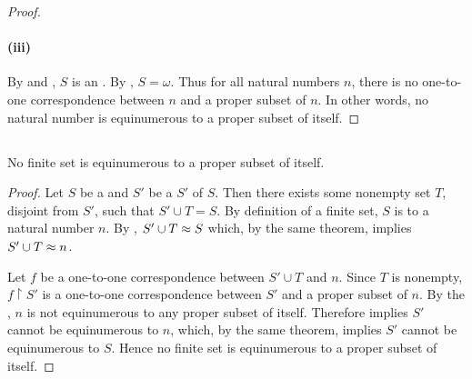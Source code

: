 \documentclass{report}
\begin{document}
\begin{proof}
    \paragraph{(iii)}%

      By  and
        , $S$ is an
        .
      By , $S = \omega$.
      Thus for all natural numbers $n$, there is no one-to-one correspondence
        between $n$ and a proper subset of $n$.
      In other words, no natural number is equinumerous to a proper subset of
        itself.

  \end{proof}

\subsection{}%

  \begin{corollary}[6C]
    No finite set is equinumerous to a proper subset of itself.
  \end{corollary}

  \begin{proof}
    Let $S$ be a  and $S'$ be a
       $S'$ of $S$.
    Then there exists some nonempty set $T$, disjoint from $S'$, such that
      $S' \cup T = S$.
    By definition of a finite set, $S$ is  to a
      natural number $n$.
    By , $S' \cup T \approx S$ which, by the
      same theorem, implies $S' \cup T \approx n$.

    Let $f$ be a one-to-one correspondence between $S' \cup T$ and $n$.
    Since $T$ is nonempty, $f \restriction S'$ is a one-to-one correspondence
      between $S'$ and a proper subset of $n$.
    By the , $n$ is not equinumerous to any
      proper subset of itself.
    Therefore  implies $S'$ cannot be equinumerous to
      $n$, which, by the same theorem, implies $S'$ cannot be equinumerous to
      $S$.
    Hence no finite set is equinumerous to a proper subset of itself.
  \end{proof}

\subsection{}%
\end{document}
